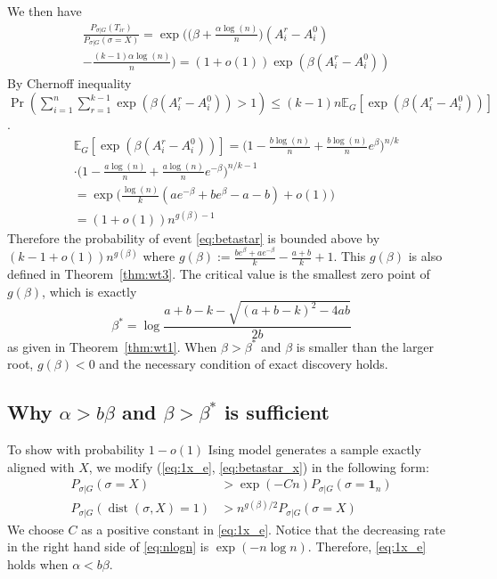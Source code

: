 \label{key}\documentclass[conference]{IEEEtran}
\DeclareMathOperator{\dist}{dist}
\begin{document}
We then have
\begin{align}
&\frac{P_{\sigma|G}(T_{ir})}
{P_{\sigma|G}(\sigma=X)}
= \exp\Big(\big(\beta+\frac{\alpha\log(n)}{n} \big) (A^r_i-A^0_i) \nonumber\\
&-\frac{(k-1)\alpha\log(n)}{n} \Big) 
= (1+o(1)) \exp ( \beta(A^r_i-A^0_i))
\end{align}
By Chernoff inequality $ \Pr(\sum_{i=1}^n\sum_{r=1}^{k-1}\exp ( \beta(A^r_i-A^0_i)) > 1) \leq (k-1)n\mathbb{E}_G[\exp (\beta (A^r_i-A^0_i))] $.
\begin{align}
&\mathbb{E}_G[\exp (\beta (A^r_i-A^0_i))]
=\Big(1-\frac{b\log(n)}{n}+\frac{b\log(n)}{n} e^{\beta} \Big)^{n/k} \nonumber \\
&\cdot \Big(1-\frac{a\log(n)}{n}+\frac{a\log(n)}{n} e^{-\beta} \Big)^{n/k-1}\nonumber\\
& = 
\exp\Big(\frac{\log(n)}{k} ( a e^{-\beta}+b e^{\beta} -a-b )
+o(1) \Big)\nonumber \\
& = (1+o(1)) n^{g(\beta)-1} \label{eq:gbetaminus1}
\end{align}
Therefore the probability of event \eqref{eq:betastar} is bounded above by $ (k-1 + o(1)) n^{g(\beta)}$
where $g(\beta)  := \frac{b e^{\beta}+a e^{-\beta}}{k}-\frac{a+b}{k}+1$. This $g(\beta)$ is also defined in Theorem~\ref{thm:wt3}.
The critical value is the smallest zero point of $g(\beta)$, which is exactly
$$
\beta^* = \log\frac{a+b-k-\sqrt{(a+b-k)^2-4ab}}{2 b}
$$
as given in Theorem~\ref{thm:wt1}.
When $\beta > \beta^*$ and $\beta$ is smaller than the larger root, $g(\beta) < 0$ and the necessary condition of exact discovery holds.

\subsection{Why $\alpha > b \beta$ and $\beta > \beta^*$ is sufficient} \label{sect:why}
To show with probability $1-o(1)$ Ising model generates a sample exactly aligned with $X$, we modify (\ref{eq:1x_e}, \ref{eq:betastar_x}) in the following form:
\begin{align}
P_{\sigma | G}(\sigma = X ) & > \exp(-Cn) P_{\sigma | G}(\sigma = \mathbf{1}_n) \label{eq:1x_e}\\
P_{\sigma | G}(\dist(\sigma, X) = 1) & > n^{g(\beta)/2}P_{\sigma | G}(\sigma = X)\label{eq:betastar_x}
\end{align}
We choose  $C$ as a positive constant in \eqref{eq:1x_e}. Notice that the decreasing rate in the right hand side of \eqref{eq:nlogn} is $\exp(-n\log n)$.
Therefore, \eqref{eq:1x_e} holds when $\alpha < b \beta $.
\end{document}
